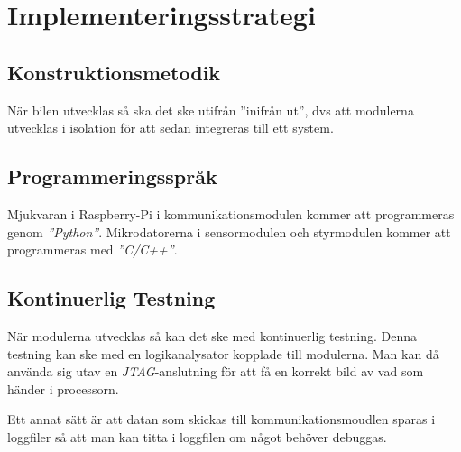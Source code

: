 \documentclass[10pt,oneside,swedish]{lips}
\begin{document}
\section{Implementeringsstrategi}
\subsection{Konstruktionsmetodik}
När bilen utvecklas så ska det ske utifrån ''inifrån ut'', dvs att modulerna utvecklas i isolation för att sedan integreras till ett system.

\subsection{Programmeringsspråk}
Mjukvaran i Raspberry-Pi i kommunikationsmodulen kommer att programmeras genom \emph{''Python''}. Mikrodatorerna i sensormodulen och styrmodulen kommer att programmeras med \emph{''C/C++''}.

\subsection{Kontinuerlig Testning}
När modulerna utvecklas så kan det ske med kontinuerlig testning. Denna testning kan ske med en logikanalysator kopplade till modulerna. Man kan då använda sig utav en \emph{JTAG}-anslutning för att få en korrekt bild av vad som händer i processorn.

Ett annat sätt är att datan som skickas till kommunikationsmoudlen sparas i loggfiler så att man kan titta i loggfilen om något behöver debuggas.

 \clearpage

\end{document}
